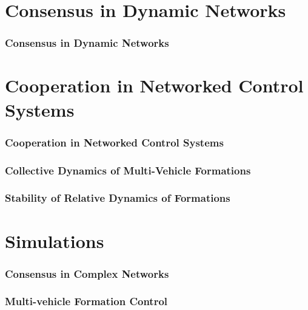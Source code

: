 \documentclass{beamer}
\begin{document}
\section{Consensus in Dynamic Networks}

\begin{frame}
\frametitle{Consensus in Dynamic Networks}


\end{frame}

\section{Cooperation in Networked Control Systems}

\begin{frame}
\frametitle{Cooperation in Networked Control Systems}


\end{frame}

\begin{frame}
\frametitle{Collective Dynamics of Multi-Vehicle Formations}

\end{frame}

\begin{frame}
\frametitle{Stability of Relative Dynamics of Formations}

\end{frame}

\section{Simulations}

\begin{frame}
\frametitle{Consensus in Complex Networks}


\end{frame}


\begin{frame}
\frametitle{Multi-vehicle Formation Control}


\end{frame}
\end{document}
